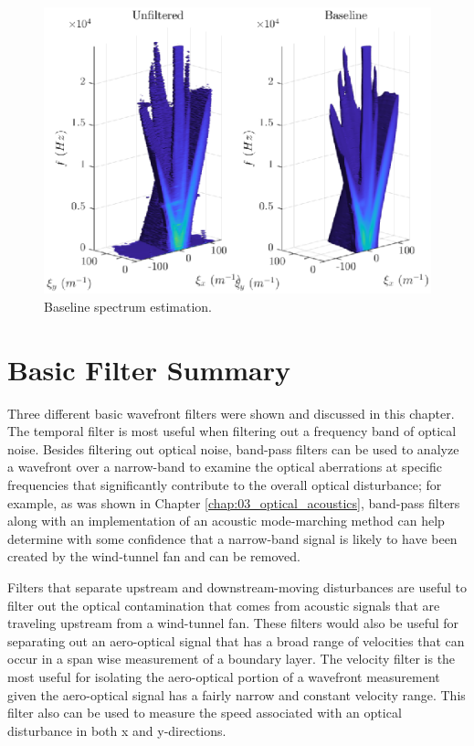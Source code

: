 \begin{figure}
  \centering
  \includegraphics{../matlab/06_single_sensor_filtering/filter_baseline.eps}
  \caption{Baseline spectrum estimation.}
  \label{fig:06_filter_baseline}
\end{figure}




\section{Basic Filter Summary}
Three different basic wavefront filters were shown and discussed in this chapter.
The temporal filter is most useful when filtering out a frequency band of optical noise.
Besides filtering out optical noise, band-pass filters can be used to analyze a wavefront over a narrow-band to examine the optical aberrations at specific frequencies that significantly contribute to the overall optical disturbance; for example, as was shown in Chapter \ref{chap:03_optical_acoustics}, band-pass filters along with an implementation of an acoustic mode-marching method can help determine with some confidence that a narrow-band signal is likely to have been created by the wind-tunnel fan and can be removed.


Filters that separate upstream and downstream-moving disturbances are useful to filter out the optical contamination that comes from acoustic signals that are traveling upstream from a wind-tunnel fan.
These filters would also be useful for separating out an aero-optical signal that has a broad range of velocities that can occur in a span wise measurement of a boundary layer.
The velocity filter is the most useful for isolating the aero-optical portion of a wavefront measurement given the aero-optical signal has a fairly narrow and constant velocity range.
This filter also can be used to measure the speed associated with an optical disturbance in both x and y-directions.

